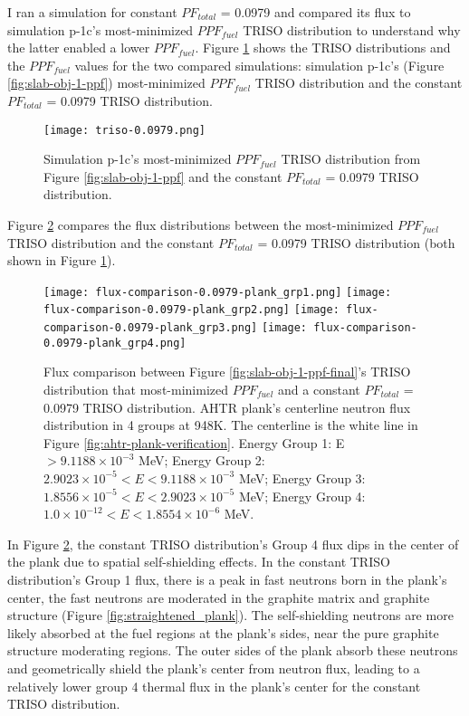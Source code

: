 I ran a simulation for constant $PF_{total}$ = 0.0979 and compared its 
flux to simulation p-1c's most-minimized $PPF_{fuel}$ TRISO distribution to understand 
why the latter enabled a lower $PPF_{fuel}$. 
Figure \ref{fig:triso-0.0979} shows the TRISO distributions and the $PPF_{fuel}$ 
values for the two compared simulations: simulation p-1c's (Figure 
\ref{fig:slab-obj-1-ppf}) most-minimized $PPF_{fuel}$ TRISO distribution and 
the constant $PF_{total}$ = 0.0979 TRISO distribution. 
\begin{figure}[htbp!]
    \centering
    \texttt{[image: triso-0.0979.png]} 
    \caption{Simulation p-1c's most-minimized $PPF_{fuel}$ TRISO distribution 
    from Figure \ref{fig:slab-obj-1-ppf} and the constant $PF_{total}$ = 0.0979 
    TRISO distribution.}
    \label{fig:triso-0.0979}
\end{figure}

Figure \ref{fig:flux-comparison-0.0979-plank} compares the flux distributions between 
the most-minimized $PPF_{fuel}$ TRISO distribution and the constant $PF_{total}$ = 0.0979 
TRISO distribution (both shown in Figure \ref{fig:triso-0.0979}).
\begin{figure}[htbp!]
    \centering
    \texttt{[image: flux-comparison-0.0979-plank\_grp1.png]} 
    \texttt{[image: flux-comparison-0.0979-plank\_grp2.png]} 
    \texttt{[image: flux-comparison-0.0979-plank\_grp3.png]} 
    \texttt{[image: flux-comparison-0.0979-plank\_grp4.png]} 
    \caption{Flux comparison between Figure \ref{fig:slab-obj-1-ppf-final}'s TRISO 
    distribution that most-minimized $PPF_{fuel}$ and a constant $PF_{total}$ = 0.0979 
    TRISO distribution. 
    \gls{AHTR} plank's centerline neutron flux distribution in 4 groups at 948K. 
    The centerline is the white line in Figure \ref{fig:ahtr-plank-verification}.
    Energy Group 1: E $> 9.1188 \times 10^{-3}$ MeV;
    Energy Group 2: $2.9023 \times 10^{-5} < E < 9.1188 \times 10^{-3}$ MeV;
    Energy Group 3:  $1.8556 \times 10^{-5} < E < 2.9023 \times 10^{-5}$ MeV;
    Energy Group 4:  $1.0 \times 10^{-12} < E < 1.8554 \times 10^{-6}$ MeV.}
    \label{fig:flux-comparison-0.0979-plank}
\end{figure}
In Figure \ref{fig:flux-comparison-0.0979-plank}, the constant TRISO distribution's 
Group 4 flux dips in the center of the plank due to spatial self-shielding effects. 
In the constant TRISO distribution's Group 1 flux, there is a peak in fast neutrons
born in the plank's center, the fast neutrons are moderated in the graphite matrix 
and graphite structure (Figure \ref{fig:straightened_plank}). 
The self-shielding neutrons are more likely absorbed at the fuel regions at the 
plank's sides, near the pure graphite structure moderating regions. 
The outer sides of the plank absorb these neutrons and geometrically shield the 
plank's center from neutron flux, leading to a relatively lower group 4 thermal 
flux in the plank's center for the constant TRISO distribution. 

